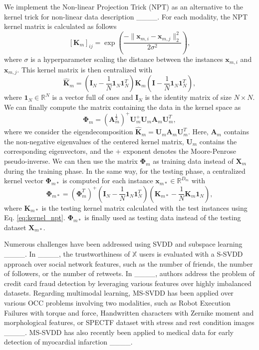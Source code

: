 We implement the Non-linear Projection Trick (NPT) as an alternative to the kernel trick for non-linear data description ____. For each modality, the NPT kernel matrix is calculated as follows
\begin{equation}\label{eq:kernel_npt}
[\mathbf{K}_{m}]_{ij} = \exp  \left( \frac{ -\| \mathbf{x}_{m,i} - \mathbf{x}_{m,j}\|_2^2 }{ 2\sigma^2 } \right),
\end{equation}
where $\sigma$ is a hyperparameter scaling the distance between the instances $\mathbf{x}_{m, i}$ and $\mathbf{x}_{m, j}$. This kernel matrix is then centralized with
\begin{equation}\label{eq:kernel_npt_centr}
    \hat{\mathbf{K}}_m = (\mathbf{I}_N - \frac{1}{N}\mathbf{1}_N\mathbf{1}^T_N)\mathbf{K}_m(\mathbf{I} - \frac{1}{N}\mathbf{1}_N\mathbf{1}^T_N),
\end{equation}
where $\mathbf{1}_N \in \mathbb{R}^N$ is a vector full of ones and $\mathbf{I}_N$ is the identity matrix of size $N\times N$. We can finally compute the matrix containing the data in the kernel space as
\begin{equation}\label{eq:kernel_space}
    \boldsymbol{\Phi}_m = (\mathbf{A}_m^{\frac{1}{2}})^{+}\mathbf{U}_m^{+}\mathbf{U}_m\mathbf{A}_m\mathbf{U}_m^T,
\end{equation}
where we consider the eigendecomposition $\hat{\mathbf{K}}_m = \mathbf{U}_m \mathbf{A}_m \mathbf{U}_m^T$. Here, $\mathbf{A}_m$ contains the non-negative eigenvalues of the centered kernel matrix, $\mathbf{U}_m$ contains the corresponding eigenvectors, and the $+$ exponent denotes the Moore-Penrose pseudo-inverse. We can then use the matrix $\boldsymbol{\Phi}_m$ as training data instead of $\mathbf{X}_m$ during the training phase. In the same way, for the testing phase, a centralized kernel vector $\boldsymbol{\Phi}_{m*}$ is computed for each instance $\mathbf{x}_{m*} \in \mathbb{R}^{D_m}$ with
\begin{equation}\label{test_npt}
    \boldsymbol{\Phi}_{m*} = (\boldsymbol{\Phi}_m^T)^{+}(\mathbf{I}_N - \frac{1}{N}\mathbf{1}_N\mathbf{1}^T_N)\left(\mathbf{K}_{m*} - \frac{1}{N} \mathbf{K}_m \mathbf{1}_N\right),
\end{equation}
where $\mathbf{K}_{m*}$ is the testing kernel matrix calculated with the test instances using Eq. \ref{eq:kernel_npt}. $\boldsymbol{\Phi}_{m*}$ is finally used as testing data instead of the testing dataset $\mathbf{X}_{m*}$.  


Numerous challenges have been addressed using SVDD and subspace learning ____. In ____, the trustworthiness of $\mathbb{X}$ users is evaluated with a S-SVDD approach over social network features, such as the number of friends, the number of followers, or the number of retweets. In ____, authors address the problem of credit card fraud detection by leveraging various features over highly imbalanced datasets. Regarding multimodal learning, MS-SVDD has been applied over various OCC problems involving two modalities, such as Robot Execution Failures with torque and force, Handwritten characters with Zernike moment and morphological features, or SPECTF dataset with stress and rest condition images ____. MS-SVDD has also recently been applied to medical data for early detection of myocardial infarction ____. 

